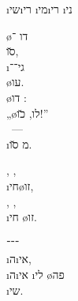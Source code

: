 \textheader%
{ \i{שי}\i{רי}}
{\i{מי}\i{רי} \i{ני}}
{}
{}
{}
{}
{}




\begin{twocol}
\begin{stanza}
\o{דו} ־\\
\u{סו},\\
\i{גי}־־\\
\o{עו}.\\
\o{דו} :\\
„\o{לו}, \u{כו}!”\\
~—\\
\i{מ} \u{סו}.
\end{stanza}
\end{twocol}




\begin{twocol}
\begin{stanza}
, ,\\
\i{חי}\o{זו},\\
, ,\\
\i{חי} \o{זו}.
\end{stanza}

\begin{stanza}
־־־\\
\i{ה}\i{אי},\\
\i{ה}\i{אי} \i{לי} \o{פה}\\
 \i{שי}.
\end{stanza}
\end{twocol}
